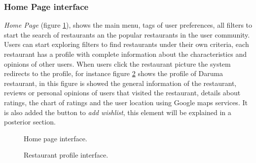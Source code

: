 \subsubsection{Home Page interface}
\textit{Home Page} (figure \ref{fig:home-page}), shows the main 
menu, tags of user preferences,
all filters to start the search of restaurants an the popular
restaurants in the user community. Users can start exploring filters
to find restaurants under their own criteria, each restaurant has a
profile with complete information about the characteristics and
opinions of other users. When users click the restaurant picture the
system redirects to the profile, for instance figure \ref{fig:rest-profile2}  
shows the profile of Daruma restaurant, in this figure is showed the general
information of the restaurant, reviews or personal opinions of users
that visited the restaurant, details about ratings, the chart of
ratings and the user location using Google maps services. It is also
added the button to \textit{add wishlist}, this element will be explained in a
posterior section.
\begin{figure}
\captionsetup{font=footnotesize}
\centering
{}
\caption{Home page interface.}
\label{fig:home-page}   
\end{figure}
\begin{figure}
\captionsetup{font=footnotesize}
\centering
{}
\caption{Restaurant profile interface.}
\label{fig:rest-profile2}   
\end{figure}
